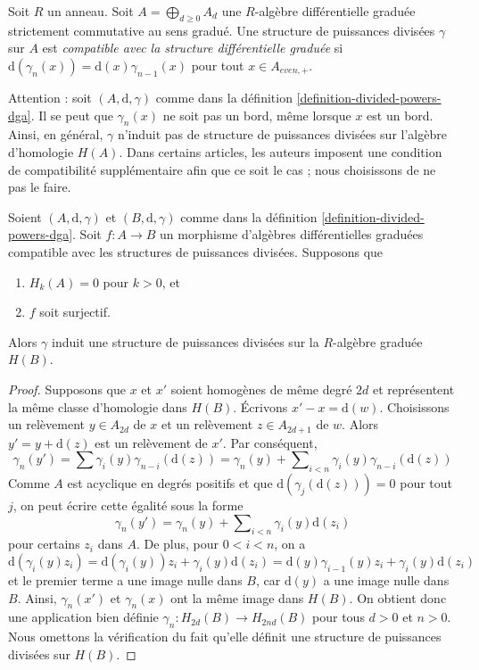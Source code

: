 \begin{definition}
\label{definition-divided-powers-dga}
Soit $R$ un anneau. Soit $A = \bigoplus_{d \geq 0} A_d$ une
$R$-algèbre différentielle graduée strictement commutative au sens
gradué. Une structure de puissances divisées $\gamma$ sur $A$ est {\it compatible avec
la structure différentielle graduée} si
$\text{d}(\gamma_n(x)) = \text{d}(x) \gamma_{n - 1}(x)$ pour
tout $x \in A_{even, +}$.
\end{definition}

\noindent
Attention : soit $(A, \text{d}, \gamma)$ comme dans
la définition \ref{definition-divided-powers-dga}.
Il se peut que $\gamma_n(x)$ ne soit pas un bord, même lorsque
$x$ est un bord. Ainsi, en général, $\gamma$ n'induit pas de structure
de puissances divisées sur l'algèbre d'homologie $H(A)$.
Dans certains articles, les auteurs imposent une condition de
compatibilité supplémentaire afin que ce soit le cas ; nous choisissons de ne
pas le faire.

\begin{lemma}
\label{lemma-dpdga-good}
Soient $(A, \text{d}, \gamma)$ et $(B, \text{d}, \gamma)$ comme dans
la définition \ref{definition-divided-powers-dga}. Soit $f : A \to B$
un morphisme d'algèbres différentielles graduées compatible avec les structures de
puissances divisées. Supposons que
\begin{enumerate}
\item $H_k(A) = 0$ pour $k > 0$, et
\item $f$ soit surjectif.
\end{enumerate}
Alors $\gamma$ induit une structure de puissances divisées sur la
$R$-algèbre graduée $H(B)$.
\end{lemma}

\begin{proof}
Supposons que $x$ et $x'$ soient homogènes de même degré $2d$
et représentent la même classe d'homologie dans $H(B)$. Écrivons $x' - x = \text{d}(w)$.
Choisissons un relèvement $y \in A_{2d}$ de $x$ et un relèvement $z \in A_{2d + 1}$
de $w$. Alors $y' = y + \text{d}(z)$ est un relèvement de $x'$.
Par conséquent,
$$
\gamma_n(y') = \sum\gamma_i(y) \gamma_{n - i}(\text{d}(z))
= \gamma_n(y) +
\sum\nolimits_{i < n} \gamma_i(y) \gamma_{n - i}(\text{d}(z))
$$
Comme $A$ est acyclique en degrés positifs et que
$\text{d}(\gamma_j(\text{d}(z))) = 0$ pour tout $j$, on peut écrire cette
égalité sous la forme
$$
\gamma_n(y') = \gamma_n(y) +
\sum\nolimits_{i < n} \gamma_i(y) \text{d}(z_i)
$$
pour certains $z_i$ dans $A$. De plus, pour $0 < i < n$, on a
$$
\text{d}(\gamma_i(y) z_i) =
\text{d}(\gamma_i(y))z_i + \gamma_i(y)\text{d}(z_i) =
\text{d}(y) \gamma_{i - 1}(y) z_i + \gamma_i(y)\text{d}(z_i)
$$
et le premier terme a une image nulle dans $B$, car $\text{d}(y)$ a une image nulle dans $B$.
Ainsi, $\gamma_n(x')$ et $\gamma_n(x)$ ont la même image dans $H(B)$.
On obtient donc une application bien définie $\gamma_n : H_{2d}(B) \to H_{2nd}(B)$
pour tous $d > 0$ et $n > 0$. Nous omettons la vérification du fait qu'elle
définit une structure de puissances divisées sur $H(B)$.
\end{proof}

